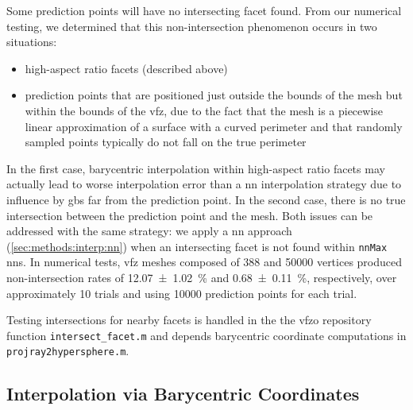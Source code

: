 \documentclass[final,twocolumn,12pt]{elsarticle}
\newcommand{\outpt}{prediction}
\newcommand{\vfzorepo}{\gls{vfzo} repository}
\begin{document}
{\begin{appendices}
Some \outpt{} points will have no intersecting facet found.
From our numerical testing, we determined that this non-intersection phenomenon occurs in two situations:
\begin{itemize}
    \item high-aspect ratio facets (described above)
    \item \outpt{} points that are positioned just outside the bounds of the mesh but within the bounds of the \gls{vfz}, due to the fact that the mesh is a piecewise linear approximation of a surface with a curved perimeter and that randomly sampled points typically do not fall on the true perimeter
\end{itemize}
In the first case, barycentric interpolation within high-aspect ratio facets may actually lead to worse interpolation error than a \gls{nn} interpolation strategy due to influence by \glspl{gb} far from the \outpt{} point. In the second case, there is no true intersection between the \outpt{} point and the mesh. Both issues can be addressed with the same strategy: we apply a \gls{nn} approach (\cref{sec:methods:interp:nn}) when an intersecting facet is not found within \texttt{nnMax} \glspl{nn}. In numerical tests, \gls{vfz} meshes composed of \num{388} and \num{50000} vertices produced non-intersection rates of \SI{12.07 \pm 1.02}{\percent} and \SI{0.68 \pm 0.11}{\percent}, respectively, over approximately \num{10} trials and using \num{10000} \outpt{} points for each trial.

Testing intersections for nearby facets is handled in the the \vfzorepo{} function \texttt{intersect\_facet.m} and depends barycentric coordinate computations in \texttt{projray2hypersphere.m}.

\subsection{Interpolation via Barycentric Coordinates}
\label{sec:app:bary-interp}


\end{appendices}}
\end{document}
